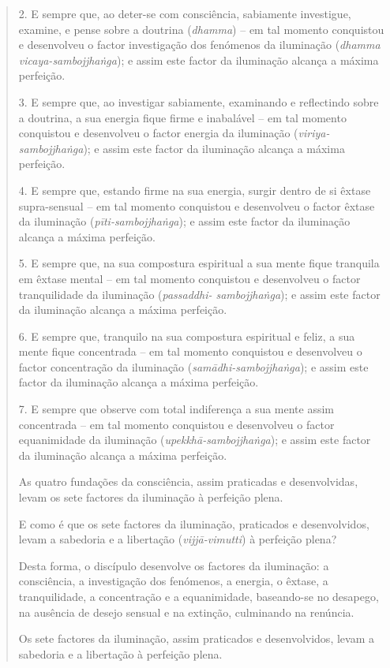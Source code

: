 \begin{quote}
2. E sempre que, ao deter-se com consciência, sabiamente investigue, examine, e pense sobre a doutrina (\emph{dhamma}) -- em tal momento conquistou e desenvolveu o factor investigação dos fenómenos da iluminação (\emph{dhamma vicaya-sambojjhaṅga}); e assim este factor da iluminação alcança a máxima perfeição.

3. E sempre que, ao investigar sabiamente, examinando e reflectindo sobre a doutrina, a sua energia fique firme e inabalável -- em tal momento conquistou e desenvolveu o factor energia da iluminação (\emph{viriya-sambojjhaṅga}); e assim este factor da iluminação alcança a máxima perfeição.

4. E sempre que, estando firme na sua energia, surgir dentro de si êxtase supra-sensual -- em tal momento conquistou e desenvolveu o factor êxtase da iluminação (\emph{pīti-sambojjhaṅga}); e assim este factor da iluminação alcança a máxima perfeição.

5. E sempre que, na sua compostura espiritual a sua mente fique tranquila em êxtase mental -- em tal momento conquistou e desenvolveu o factor tranquilidade da iluminação (\emph{passaddhi- sambojjhaṅga}); e assim este factor da iluminação alcança a máxima perfeição.

6. E sempre que, tranquilo na sua compostura espiritual e feliz, a sua mente fique concentrada -- em tal momento conquistou e desenvolveu o factor concentração da iluminação (\emph{samādhi-sambojjhaṅga}); e assim este factor da iluminação alcança a máxima perfeição.

7. E sempre que observe com total indiferença a sua mente assim concentrada -- em tal momento conquistou e desenvolveu o factor equanimidade da iluminação (\emph{upekkhā-sambojjhaṅga}); e assim este factor da iluminação alcança a máxima perfeição.

As quatro fundações da consciência, assim praticadas e desenvolvidas, levam os sete factores da iluminação à perfeição plena.

E como é que os sete factores da iluminação, praticados e desenvolvidos, levam a sabedoria e a libertação (\emph{vijjā-vimutti}) à perfeição plena?

Desta forma, o discípulo desenvolve os factores da iluminação: a consciência, a investigação dos fenómenos, a energia, o êxtase, a tranquilidade, a concentração e a equanimidade, baseando-se no desapego, na ausência de desejo sensual e na extinção, culminando na renúncia.

Os sete factores da iluminação, assim praticados e desenvolvidos, levam a sabedoria e a libertação à perfeição plena.


\end{quote}
